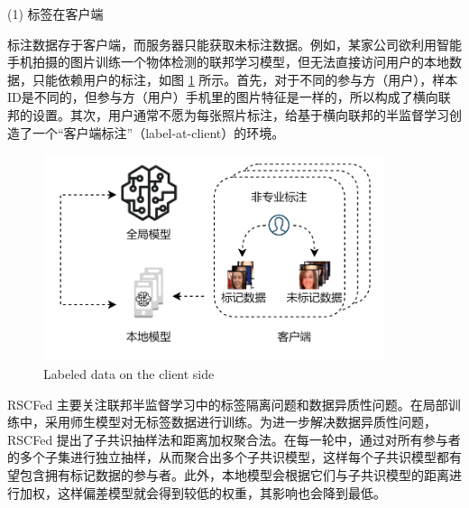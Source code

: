 (1) 标签在客户端

标注数据存于客户端，而服务器只能获取未标注数据。例如，某家公司欲利用智能手机拍摄的图片训练一个物体检测的联邦学习模型，但无法直接访问用户的本地数据，只能依赖用户的标注，如图 \ref{LabelAtClient} 所示。首先，对于不同的参与方（用户），样本ID是不同的，但参与方（用户）手机里的图片特征是一样的，所以构成了横向联邦的设置。其次，用户通常不愿为每张照片标注，给基于横向联邦的半监督学习创造了一个“客户端标注”（label-at-client）的环境。

\begin{figure}[h] %
	\centering %
	\includegraphics[width=10cm]{chapters/imgs/LabelAtClient} %
	{\wuhao Labeled data on the client side} %
	\label{LabelAtClient} %
\end{figure} %

RSCFed\citep{liang2022rscfed} 主要关注联邦半监督学习中的标签隔离问题和数据异质性问题。在局部训练中，采用师生模型\citep{tarvainen2017mean}对无标签数据进行训练。为进一步解决数据异质性问题，RSCFed 提出了子共识抽样法和距离加权聚合法。在每一轮中，通过对所有参与者的多个子集进行独立抽样，从而聚合出多个子共识模型，这样每个子共识模型都有望包含拥有标记数据的参与者。此外，本地模型会根据它们与子共识模型的距离进行加权，这样偏差模型就会得到较低的权重，其影响也会降到最低。

